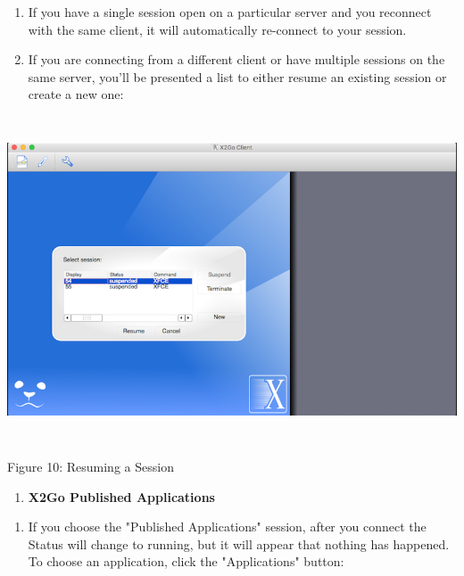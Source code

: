 \documentclass{article}
\begin{document}
\begin{enumerate}
\def\labelenumi{\arabic{enumi}.}
\setcounter{enumi}{14}
\item
  If you have a single session open on a particular server and you
  reconnect with the same client, it will automatically re-connect to
  your session.
\item
  If you are connecting from a different client or have multiple
  sessions on the same server, you'll be presented a list to either
  resume an existing session or create a new one:
\end{enumerate}

\includegraphics[width=6.26806in,height=3.8057in]{images/media/image10.png}

Figure 10: Resuming a Session

\begin{enumerate}
\def\labelenumi{\Alph{enumi}.}
\setcounter{enumi}{5}
\item
  \textbf{X2Go Published Applications}
\end{enumerate}

\begin{enumerate}
\def\labelenumi{\arabic{enumi}.}
\setcounter{enumi}{16}
\item
  If you choose the "Published Applications" session, after you connect
  the Status will change to running, but it will appear that nothing has
  happened. To choose an application, click the "Applications" button:
\end{enumerate}
\end{document}
